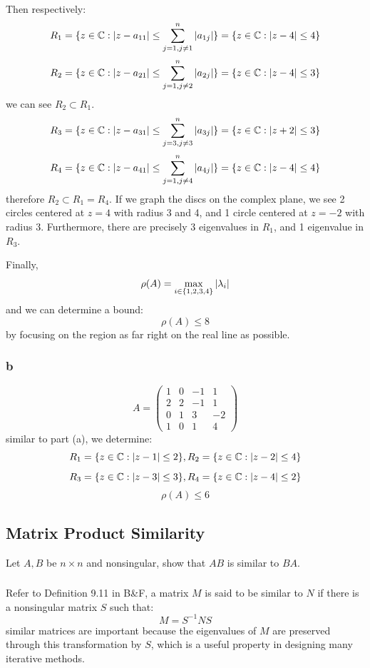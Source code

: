 \documentclass[12pt]{article} %
\newcommand{\1}[1]{\mathds{1}\left[#1\right]}
\begin{document}
Then respectively:
$$
R_1 = \{z\in \mathbb{C}: \abs{z-a_{11}} \le \sum_{j=1,j\neq 1}^{n}\abs{a_{1j}}\}
=
\{z\in \mathbb{C}: \abs{z-4} \le 4\}
$$
$$
	R_2 = \{z\in \mathbb{C}: \abs{z-a_{21}} \le \sum_{j=1,j\neq 2}^{n}\abs{a_{2j}}\}
=
\{z\in \mathbb{C}: \abs{z-4} \le 3\}
$$ we can see $R_2\subset R_1$.
$$
	R_3 = \{z\in \mathbb{C}: \abs{z-a_{31}} \le \sum_{j=3,j\neq 3}^{n}\abs{a_{3j}}\}
=
\{z\in \mathbb{C}: \abs{z+2} \le 3\}
$$
$$
	R_4 = \{z\in \mathbb{C}: \abs{z-a_{41}} \le \sum_{j=1,j\neq 4}^{n}\abs{a_{4j}}\}
=
\{z\in \mathbb{C}: \abs{z-4} \le 4\}
$$ therefore $R_2\subset R_1=R_4$. If we graph the discs on the complex plane, we see 2 circles centered at $z=4$ with radius 3 and 4, and 1 circle centered at $z=-2$ with radius 3. Furthermore, there are precisely 3 eigenvalues in $R_1$, and 1 eigenvalue in $R_3$.

Finally, 
$$
\rho(A) = \max_{i\in\{1,2,3,4\}}\abs{\lambda_i}
$$ and we can determine a bound:
$$
	\rho(A) \le 8
$$ by focusing on the region as far right on the real line as possible.





\subsubsection{b}
$$
A = \begin{pmatrix}
	1 & 0 & -1 & 1\\
	2 & 2 & -1 & 1\\
	0 & 1 & 3 & -2\\
	1 & 0 & 1 & 4
\end{pmatrix}
$$ similar to part (a), we determine:
$$
	R_1 = \{z\in \mathbb{C}: \abs{z-1} \le 2\}, R_2 = \{z\in \mathbb{C}: \abs{z-2} \le 4\}
$$
$$
	R_3 = \{z\in \mathbb{C}: \abs{z-3} \le 3\}, R_4 = \{z\in \mathbb{C}: \abs{z-4} \le 2\}
$$ 
$$
	\rho(A) \le 6
$$






\newpage
\subsection{Matrix Product Similarity}
Let $A,B$ be $n\times n$ and nonsingular, show that $AB$ is similar to $BA$.

\subsubsection{}
Refer to Definition 9.11 in B\&F, a matrix $M$ is said to be similar to $N$ if there is a nonsingular matrix $S$ such that:
$$
	M = S^{-1}NS
$$ similar matrices are important because the eigenvalues of $M$ are preserved through this transformation by $S$, which is a useful property in designing many iterative methods.
\end{document}
